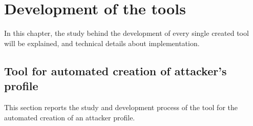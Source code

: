 
\chapter{Development of the tools}
\label{cap:tools}
In this chapter, the study behind the development of every single created tool will be explained, and technical details about implementation.

\section{Tool for automated creation of attacker's profile}
This section reports the study and development process of the tool for the automated creation of an attacker profile.

